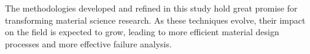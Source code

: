 \documentclass[preprint,12pt]{elsarticle}
\begin{document}
The methodologies developed and refined in this study hold great promise for transforming material science research. As these techniques evolve, their impact on the field is expected to grow, leading to more efficient material design processes and more effective failure analysis.











 
 




\end{document}
